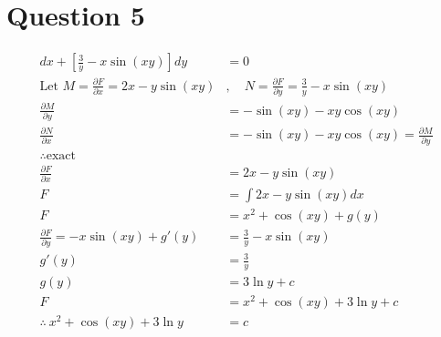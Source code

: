 \documentclass{article}
\begin{document}
\section*{Question 5}
\begin{align*}
    [2x - y\sin(xy)]dx+[\frac{3}{y}-x\sin(xy)]dy                                & =0                                                           \\
    \text{Let } M=\frac{\partial F}{\partial x}=2x-y\sin(xy)                    & ,\quad N=\frac{\partial F}{\partial y}=\frac{3}{y}-x\sin(xy) \\
    \frac{\partial M}{\partial y}                                               & =-\sin(xy)-xy\cos(xy)                                        \\
    \frac{\partial N}{\partial x}                                               & =-\sin(xy)-xy\cos(xy) = \frac{\partial M}{\partial y}        \\
    \therefore \text{exact}                                                     &                                                              \\
    \frac{\partial F}{\partial x}                                               & =2x-y\sin(xy)                                                \\
    F                                                                           & =\int 2x-y\sin(xy)dx                                         \\
    F                                                                           & =x^2+\cos(xy)+g(y)                                           \\
    \frac{\partial F}{\partial y}                            = -x\sin(xy)+g'(y) & = \frac{3}{y}-x\sin(xy)                                      \\
    g'(y)                                                                       & =\frac{3}{y}                                                 \\
    g(y)                                                                        & =3\ln y+c                                                    \\
    F                                                                           & =x^2+\cos(xy)+3\ln y+c                                       \\
    \therefore\ x^2+\cos(xy)+3\ln y                                             & = c                                                          \\
\end{align*}
\end{document}
